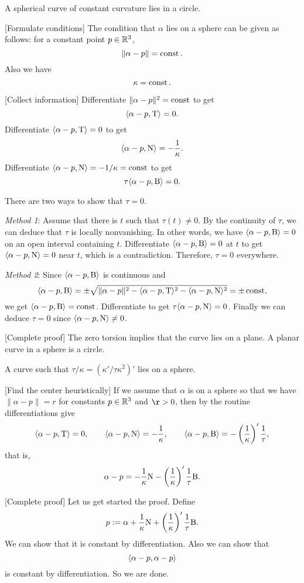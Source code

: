 \documentclass{../exp}
\def\a{\alpha}
\begin{document}
\begin{prb}
A spherical curve of constant curvature lies in a circle.
\end{prb}
\begin{sol}
[Formulate conditions]
The condition that $\a$ lies on a sphere can be given as follows: for a constant point $p\in\mathbb{R}^3$,
\[\|\a-p\|=\const.\]
Also we have
\[\kappa=\operatorname{const}.\]

[Collect information]
Differentiate $\|\a-p\|^2=\const$ to get
\[\<\a-p,\rT\>=0.\]
Differentiate $\<\a-p,\rT\>=0$ to get
\[\<\a-p,\rN\>=-\frac1\kappa.\]
Differentiate $\<\a-p,\rN\>=-1/\kappa=\const$ to get
\[\tau\<\a-p,\rB\>=0.\]

There are two ways to show that $\tau=0$.

\emph{Method 1}:
Assume that there is $t$ such that $\tau(t)\ne0$.
By the continuity of $\tau$, we can deduce that $\tau$ is locally nonvanishing.
In other words, we have $\<\a-p,\rB\>=0$ on an open interval containing $t$.
Differentiate $\<\a-p,\rB\>=0$ at $t$ to get $\<\a-p,\rN\>=0$ near $t$, which is a contradiction.
Therefore, $\tau=0$ everywhere.

\emph{Method 2}:
Since $\<\a-p,\rB\>$ is continuous and
\[\<\a-p,\rB\>=\pm\sqrt{\|\a-p\|^2-\<\a-p,\rT\>^2-\<\a-p,\rN\>^2}=\pm\const,\]
we get $\<\a-p,\rB\>=\const$.
Differentiate to get $\tau\<\a-p,\rN\>=0$.
Finally we can deduce $\tau=0$ since $\<\a-p,\rN\>\ne0$.

[Complete proof]
The zero torsion implies that the curve lies on a plane.
A planar curve in a sphere is a circle.
\end{sol}

\begin{prb}
A curve such that $\tau/\kappa=(\kappa'/\tau\kappa^2)'$ lies on a sphere.
\end{prb}
\begin{sol}
[Find the center heuristically]
If we assume that $\a$ is on a sphere so that we have $\|\a-p\|=r$ for constants $p\in\mathbb{R}^3$ and $\r>0$, then by the routine differentiations give
\[\<\a-p,\rT\>=0,\qquad\<\a-p,\rN\>=-\frac1\kappa,\qquad\<\a-p,\rB\>=-\left(\frac1\kappa\right)'\frac1\tau,\]
that is,
\[\a-p=-\frac1\kappa\rN-\left(\frac1\kappa\right)'\frac1\tau\rB.\]

[Complete proof]
Let us get started the proof.
Define
\[p:=\a+\frac1\kappa\rN+\left(\frac1\kappa\right)'\frac1\tau\rB.\]
We can show that it is constant by differentiation.
Also we can show that
\[\<\a-p,\a-p\>\]
is constant by differentiation.
So we are done.
\end{sol}
\end{document}
